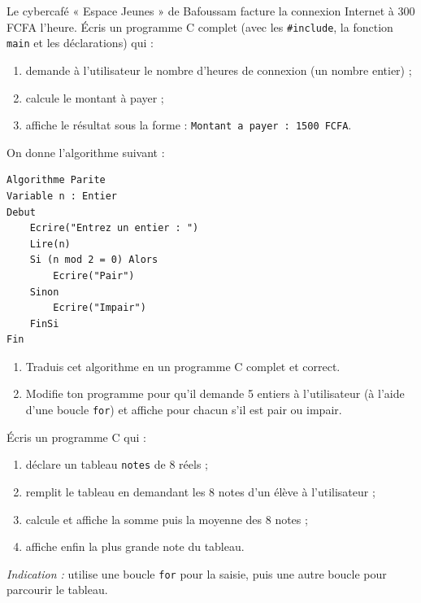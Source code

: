 \documentclass[11pt]{article}
\newcounter{popsec}
\newcounter{popsub}
\newcommand{\courssub}[1]{%
  \stepcounter{popsub}%
  \par\vspace{9pt}\noindent{\popxbold\fontsize{11.5}{13}\selectfont\color{popink}{\color{poporange}\thepopsec.\thepopsub}\hspace{6pt}#1}\par\nopagebreak\vspace{4pt}
}
\begin{document}
\courssub{Je m'entraîne}

\begin{exercice}
Le cybercafé « Espace Jeunes » de Bafoussam facture la connexion Internet à \num{300} FCFA l'heure. Écris un programme C complet (avec les \texttt{\#include}, la fonction \texttt{main} et les déclarations) qui :
\begin{enumerate}
  \item demande à l'utilisateur le nombre d'heures de connexion (un nombre entier) ;
  \item calcule le montant à payer ;
  \item affiche le résultat sous la forme : \texttt{Montant a payer : 1500 FCFA}.
\end{enumerate}
\end{exercice}

\begin{exercice}
On donne l'algorithme suivant :
\begin{lstlisting}
Algorithme Parite
Variable n : Entier
Debut
    Ecrire("Entrez un entier : ")
    Lire(n)
    Si (n mod 2 = 0) Alors
        Ecrire("Pair")
    Sinon
        Ecrire("Impair")
    FinSi
Fin
\end{lstlisting}
\begin{enumerate}
  \item Traduis cet algorithme en un programme C complet et correct.
  \item Modifie ton programme pour qu'il demande 5 entiers à l'utilisateur (à l'aide d'une boucle \texttt{for}) et affiche pour chacun s'il est pair ou impair.
\end{enumerate}
\end{exercice}

\begin{exercice}
Écris un programme C qui :
\begin{enumerate}
  \item déclare un tableau \texttt{notes} de 8 réels ;
  \item remplit le tableau en demandant les 8 notes d'un élève à l'utilisateur ;
  \item calcule et affiche la somme puis la moyenne des 8 notes ;
  \item affiche enfin la plus grande note du tableau.
\end{enumerate}
\emph{Indication :} utilise une boucle \texttt{for} pour la saisie, puis une autre boucle pour parcourir le tableau.
\end{exercice}
\end{document}
